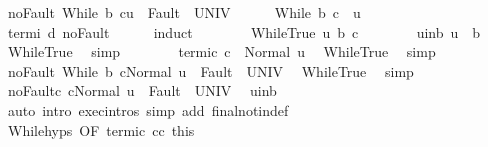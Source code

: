 \begin{isabellebody}
\ noFault{\isacharcolon}\ {\isachardoublequoteopen}{\isasymGamma}{\isasymturnstile}{\isasymlangle}While\ b\ c{\isacharprime}{\isacharcomma}u\ {\isasymrangle}\ {\isasymRightarrow}{\isasymnotin}Fault\ {\isacharbackquote}\ UNIV{\isachardoublequoteclose}\isanewline
\ \ \ \ \isamarkupfalse%
\ {\isachardoublequoteopen}{\isasymGamma}{\isasymturnstile}While\ b\ c{\isacharprime}{\isacharprime}\ {\isasymdown}\ u{\isachardoublequoteclose}\isanewline
\ \ \ \ \isamarkupfalse%
\ termi\ d\ noFault\isanewline
\ \ \ \ \isamarkupfalse%
\ {\isacharparenleft}induct{\isacharparenright}\isanewline
\ \ \ \ \ \ \isamarkupfalse%
\ {\isacharparenleft}WhileTrue\ u\ b{\isacharprime}\ c{\isacharprime}{\isacharprime}{\isacharprime}{\isacharparenright}\isanewline
\ \ \ \ \ \ \isamarkupfalse%
\ u{\isacharunderscore}in{\isacharunderscore}b{\isacharcolon}\ {\isachardoublequoteopen}u\ {\isasymin}\ b{\isachardoublequoteclose}\ \isamarkupfalse%
\ WhileTrue\ \isamarkupfalse%
\ simp\isanewline
\ \ \ \ \ \ \isamarkupfalse%
\ termi{\isacharunderscore}c{\isacharprime}{\isacharcolon}\ {\isachardoublequoteopen}{\isasymGamma}{\isasymturnstile}c{\isacharprime}\ {\isasymdown}\ Normal\ u{\isachardoublequoteclose}\ \isamarkupfalse%
\ WhileTrue\ \isamarkupfalse%
\ simp\isanewline
\ \ \ \ \ \ \isamarkupfalse%
\ noFault{\isacharcolon}\ {\isachardoublequoteopen}{\isasymGamma}{\isasymturnstile}{\isasymlangle}While\ b\ c{\isacharprime}{\isacharcomma}Normal\ u\ {\isasymrangle}\ {\isasymRightarrow}{\isasymnotin}Fault\ {\isacharbackquote}\ UNIV{\isachardoublequoteclose}\ \isamarkupfalse%
\ WhileTrue\ \isamarkupfalse%
\ simp\isanewline
\ \ \ \ \ \ \isamarkupfalse%
\ noFault{\isacharunderscore}c{\isacharprime}{\isacharcolon}\ {\isachardoublequoteopen}{\isasymGamma}{\isasymturnstile}{\isasymlangle}c{\isacharprime}{\isacharcomma}Normal\ u\ {\isasymrangle}\ {\isasymRightarrow}{\isasymnotin}Fault\ {\isacharbackquote}\ UNIV{\isachardoublequoteclose}\ \isamarkupfalse%
\ u{\isacharunderscore}in{\isacharunderscore}b\isanewline
\ \ \ \ \ \ \ \ \isamarkupfalse%
\ {\isacharparenleft}auto\ intro{\isacharcolon}\ exec{\isachardot}intros\ simp\ add{\isacharcolon}\ final{\isacharunderscore}notin{\isacharunderscore}def{\isacharparenright}\isanewline
\ \ \ \ \ \ \isamarkupfalse%
\ While{\isachardot}hyps\ {\isacharbrackleft}OF\ termi{\isacharunderscore}c{\isacharprime}\ c{\isacharprime}{\isacharprime}{\isacharunderscore}c{\isacharprime}\ this{\isacharbrackright}\ \isanewline

\end{isabellebody}
